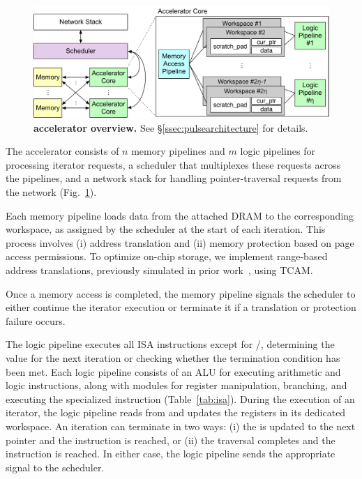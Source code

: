 \begin{figure}[t]
\centering
  \includegraphics[width=\columnwidth]{fig/pulse/accelerator.pdf}
 \caption[\pulse accelerator overview]{\textbf{\pulse accelerator overview.} See \S\ref{ssec:pulsearchitecture} for details.}
\label{fig:accelnew}
\end{figure}
 The \pulse accelerator consists of $n$ memory pipelines and $m$ logic pipelines for processing iterator requests, a scheduler that multiplexes these requests across the pipelines, and a network stack for handling pointer-traversal requests from the network (Fig.~\ref{fig:accelnew}).

 Each memory pipeline loads data from the attached DRAM to the corresponding workspace, as assigned by the scheduler at the start of each iteration. This process involves (i) address translation and (ii) memory protection based on page access permissions. To optimize on-chip storage, we implement range-based address translations, previously simulated in prior work~\cite{range}, using TCAM.

Once a memory access is completed, the memory pipeline signals the scheduler to either continue the iterator execution or terminate it if a translation or protection failure occurs.

 The logic pipeline executes all \pulse ISA instructions except for /, determining the  value for the next iteration or checking whether the termination condition has been met. Each logic pipeline consists of an ALU for executing arithmetic and logic instructions, along with modules for register manipulation, branching, and executing the specialized  instruction (Table~\ref{tab:isa}). During the execution of an iterator, the logic pipeline reads from and updates the registers in its dedicated workspace. An iteration can terminate in two ways: (i) the  is updated to the next pointer and the  instruction is reached, or (ii) the traversal completes and the  instruction is reached. In either case, the logic pipeline sends the appropriate signal to the scheduler.

